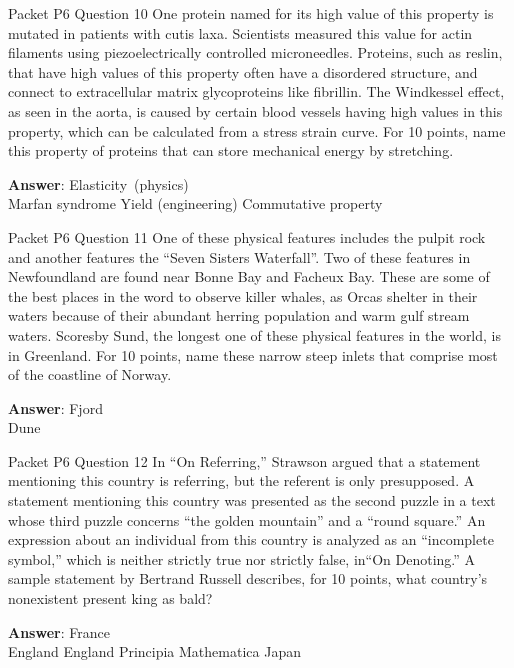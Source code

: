 \begin{frame}{Packet P6 Question 10}
One protein named for its high value of this property is mutated in patients with cutis laxa. Scientists measured this value for actin filaments using piezoelectrically controlled microneedles. Proteins, such as reslin, that have high values of this property often have a disordered structure, and connect to extracellular matrix glycoproteins like fibrillin. The Windkessel effect, as seen in the aorta, is caused by certain   blood vessels having high values in this property, which can be calculated from a stress strain curve. For 10 points, name this property of proteins that can   store mechanical energy by stretching.    

\textbf{Answer}: Elasticity\ (physics)\\
 Marfan syndrome
 Yield (engineering)
 Commutative property
\end{frame}

\begin{frame}{Packet P6 Question 11}
One of these physical features includes the pulpit rock and another features the “Seven Sisters Waterfall”. Two of these features in Newfoundland are found near Bonne Bay and Facheux Bay. These are some of the best places in the word to observe killer whales, as Orcas shelter in their waters because of their abundant herring population and warm gulf stream waters. Scoresby Sund,   the longest one of these physical features in the world, is in Greenland. For 10 points, name these narrow steep inlets     that comprise most of the coastline of Norway.  

\textbf{Answer}: Fjord\\
 Dune
\end{frame}

\begin{frame}{Packet P6 Question 12}
In “On Referring,” Strawson argued that a statement mentioning this country is referring, but the referent is only presupposed. A statement mentioning this country was presented as the second puzzle in a text whose third puzzle concerns ``the golden mountain'' and a ``round square.'' An expression about an individual from this country is analyzed as an “incomplete symbol,” which is neither strictly true nor strictly false, in“On Denoting.” A sample statement by Bertrand Russell describes, for 10 points, what country’s nonexistent present king as bald?        

\textbf{Answer}: France\\
 England
 England
 Principia Mathematica
 Japan
\end{frame}

